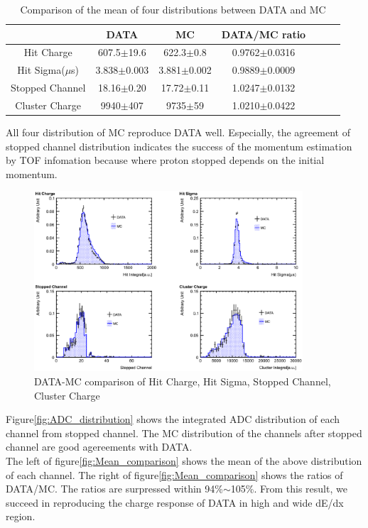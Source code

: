 \begin{table}
  \centering
  \begin{tabular}[htb]{ccccccc}\hline
                        & DATA             & MC              & DATA/MC ratio       \\ \hline
    Hit Charge          & 607.5$\pm$19.6   & 622.3$\pm$0.8   & 0.9762$\pm$0.0316   \\
    Hit Sigma($\mu$s)   & 3.838$\pm$0.003  & 3.881$\pm$0.002 & 0.9889$\pm$0.0009   \\
    Stopped Channel     & 18.16$\pm$0.20   & 17.72$\pm$0.11  & 1.0247$\pm$0.0132   \\
    Cluster Charge      & 9940$\pm$407     & 9735$\pm$59     & 1.0210$\pm$0.0422   \\ \hline
  \end{tabular}
  \label{tb:various_distribution_comparison}
  \caption{Comparison of the mean of four distributions between DATA and MC}
\end{table}

All four distribution of MC reproduce DATA well.
Especially, the agreement of stopped channel distribution indicates the success of the momentum estimation by TOF infomation because where proton stopped depends on the initial momentum.\\

\begin{figure}[htbp]
  \centering
  \includegraphics[width=10cm,clip]{./fig/stop_proton1.eps}
  \caption{DATA-MC comparison of Hit Charge, Hit Sigma, Stopped Channel, Cluster Charge}
  \label{fig:varios_distribution}
\end{figure}

Figure\ref{fig:ADC_distribution} shows the integrated ADC distribution of each channel from stopped channel.
The MC distribution of the channels after stopped channel are good agereements with DATA.\\
The left of figure\ref{fig:Mean_comparison} shows the mean of the above distribution of each channel.
The right of figure\ref{fig:Mean_comparison} shows the ratios of DATA/MC.
The ratios are surpressed within 94\%$\sim$105\%.
From this result, we succeed in reproducing the charge response of DATA in high and wide dE/dx region.

